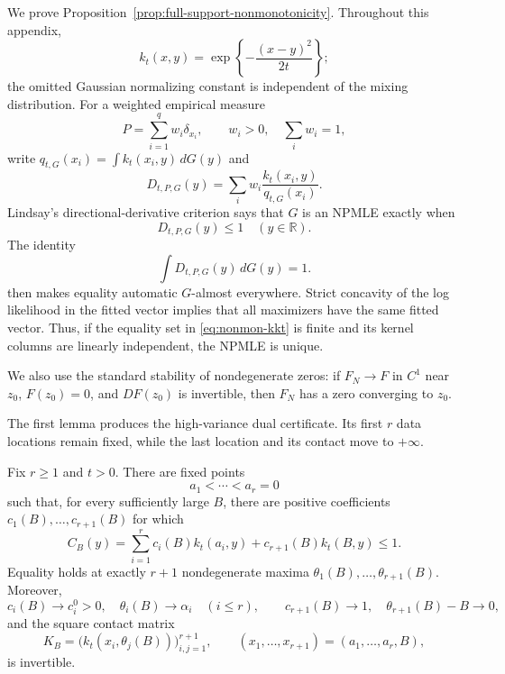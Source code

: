 We prove Proposition~\ref{prop:full-support-nonmonotonicity}. Throughout this
appendix,
\[
    k_t(x,y)=\exp\left\{-\frac{(x-y)^2}{2t}\right\};
\]
the omitted Gaussian normalizing constant is independent of the mixing
distribution. For a weighted empirical measure
\[
    P=\sum_{i=1}^q w_i\delta_{x_i},
    \qquad w_i>0,\quad \sum_iw_i=1,
\]
write \(q_{t,G}(x_i)=\int k_t(x_i,y)\,dG(y)\) and
\begin{equation}
\label{eq:nonmon-dual}
    D_{t,P,G}(y)
    =\sum_iw_i\frac{k_t(x_i,y)}{q_{t,G}(x_i)}.
\end{equation}
Lindsay's directional-derivative criterion
\cite{lindsay1983geometryA} says that \(G\) is an NPMLE exactly when
\begin{equation}
\label{eq:nonmon-kkt}
    D_{t,P,G}(y)\le1\quad(y\in\mathbb R).
\end{equation}
The identity
\begin{equation}
\label{eq:nonmon-dual-average}
    \int D_{t,P,G}(y)\,dG(y)=1.
\end{equation}
then makes equality automatic \(G\)-almost everywhere. Strict concavity of
the log likelihood in the fitted vector implies that all maximizers have the
same fitted vector. Thus, if the equality set in
\eqref{eq:nonmon-kkt} is finite and its kernel columns are linearly
independent, the NPMLE is unique.

We also use the standard stability of nondegenerate zeros: if \(F_N\to F\) in
\(C^1\) near \(z_0\), \(F(z_0)=0\), and \(DF(z_0)\) is invertible, then
\(F_N\) has a zero converging to \(z_0\).

The first lemma produces the high-variance dual certificate. Its first
\(r\) data locations remain fixed, while the last location and its contact
move to \(+\infty\).
\begin{lemma}
\label{lem:nonmon-remote-certificate}
Fix \(r\ge1\) and \(t>0\). There are fixed points
\[
    a_1<\cdots<a_r=0
\]
such that, for every sufficiently large \(B\), there are positive
coefficients \(c_1(B),\ldots,c_{r+1}(B)\) for which
\begin{equation}
\label{eq:nonmon-remote-certificate}
    C_B(y)
    =
    \sum_{i=1}^r c_i(B)k_t(a_i,y)
    +c_{r+1}(B)k_t(B,y)
    \le1.
\end{equation}
Equality holds at exactly \(r+1\) nondegenerate maxima
\(\theta_1(B),\ldots,\theta_{r+1}(B)\). Moreover,
\[
    c_i(B)\to c_i^0>0,\quad
    \theta_i(B)\to\alpha_i\quad(i\le r),
    \qquad
    c_{r+1}(B)\to1,\quad
    \theta_{r+1}(B)-B\to0,
\]
and the square contact matrix
\begin{equation}
\label{eq:nonmon-contact-matrix}
    K_B
    =
    \bigl(k_t(x_i,\theta_j(B))\bigr)_{i,j=1}^{r+1},
    \qquad
    (x_1,\ldots,x_{r+1})=(a_1,\ldots,a_r,B),
\end{equation}
is invertible.
\end{lemma}


